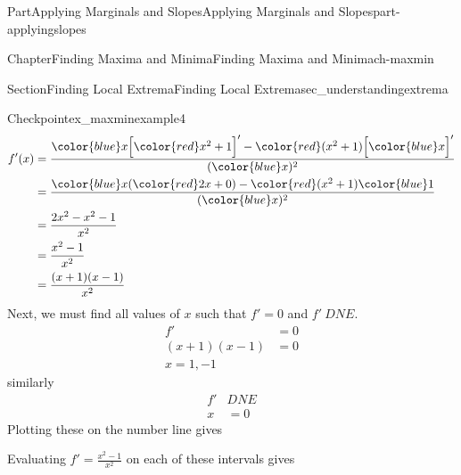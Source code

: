 \documentclass{tufte-book}
\numberwithin{equation}{chapter}
\newcommand{\red}[1]{   {\color{red}   #1}   }
\newcommand{\blue}[1]{  {\color{blue}  #1}  }
\newcommand{\D}[1]{ \Big[ #1 \Big]'  }
\newcommand{\amp}{&}
\begin{document}
\begin{partptx}{Part}{Applying Marginals and Slopes}{}{Applying Marginals and Slopes}{}{}{part-applyingslopes}
\begin{chapterptx}{Chapter}{Finding Maxima and Minima}{}{Finding Maxima and Minima}{}{}{ch-maxmin}
\begin{sectionptx}{Section}{Finding Local Extrema}{}{Finding Local Extrema}{}{}{sec_understandingextrema}
\begin{inlineexercise}{Checkpoint}{}{ex_maxminexample4}
\begin{align*}
f'(x)  \amp = \dfrac{\blue{x}\D{\red{x^2+1}} - \red{(x^2+1)}\D{\blue{x}} }{(\blue{x})^2}\\
\amp = \dfrac{\blue{x} (\red{2x+0}) - \red{(x^2+1)}\blue{1} }{(\blue{x})^2}\\
\amp = \dfrac{ 2x^2 - x^2 - 1 }{x^2}\\
\amp = \dfrac{ x^2 - 1 }{x^2}\\
\amp = \dfrac{(x+1)(x-1)}{x^2}
\end{align*}
Next, we must find all values of \(x\) such that \(f'=0\) and \(f'\ DNE\).%
\begin{align*}
f' \amp =0 \\
(x+1)(x-1) \amp =0\\
x=1,-1 
\end{align*}
similarly%
\begin{align*}
f' \amp DNE\\
x \amp =0
\end{align*}
Plotting these on the number line gives%
\par
\begin{image}{0.125}{0.75}{0.125}{}%
%
\end{image}%
%
\par
Evaluating \(f' = \frac{x^2-1}{x^2}\) on each of these intervals gives \begin{image}{0.125}{0.75}{0.125}{}%
\end{image}
\end{inlineexercise}
\end{sectionptx}
\end{chapterptx}
\end{partptx}
\end{document}
